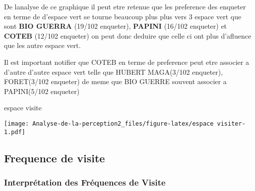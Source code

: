 \documentclass[
]{article}
\newenvironment{Shaded}{}{}
\newcommand{\AttributeTok}[1]{#1}
\newcommand{\StringTok}[1]{#1}
\begin{document}
De lanalyse de ce graphique il peut etre retenue que les preference des
enqueter en terme de d'espace vert se tourne beaucoup plus plus vers 3
espace vert que sont \textbf{BIO GUERRA} (19/102 enqueter),
\textbf{PAPINI} (16/102 enqueter) et \textbf{COTEB} (12/102 enqueter) on
peut donc deduire que celle ci ont plus d'afluence que les autre espace
vert.

Il est important notifier que COTEB en terme de preference peut etre
associer a d'autre d'autre espace vert telle que HUBERT MAGA(3/102
enqueter), FORET(3/102 enqueter) de meme que BIO GUERRE souvent associer
a PAPINI(5/102 enqueter)

\begin{Shaded}
\begin{Highlighting}[]
\StringTok{\textasciigrave{}}\AttributeTok{espace visite}\StringTok{\textasciigrave{}}
\end{Highlighting}
\end{Shaded}

\texttt{[image: Analyse-de-la-perception2\_files/figure-latex/espace visiter-1.pdf]}

\subsection{Frequence de visite}\label{frequence-de-visite}

\subsubsection{Interprétation des Fréquences de
Visite}\label{interpruxe9tation-des-fruxe9quences-de-visite}
\end{document}
